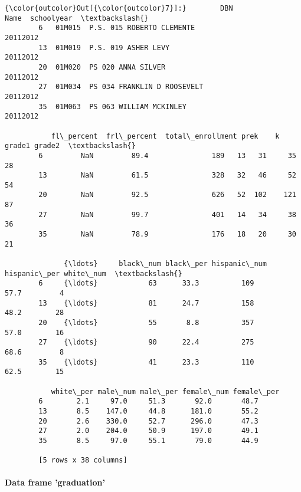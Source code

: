 \documentclass[11pt]{article}
\begin{document}
\begin{Verbatim}[commandchars=\\\{\}]
{\color{outcolor}Out[{\color{outcolor}7}]:}        DBN                                              Name  schoolyear  \textbackslash{}
        6   01M015  P.S. 015 ROBERTO CLEMENTE                           20112012   
        13  01M019  P.S. 019 ASHER LEVY                                 20112012   
        20  01M020  PS 020 ANNA SILVER                                  20112012   
        27  01M034  PS 034 FRANKLIN D ROOSEVELT                         20112012   
        35  01M063  PS 063 WILLIAM MCKINLEY                             20112012   
        
           fl\_percent  frl\_percent  total\_enrollment prek    k grade1 grade2  \textbackslash{}
        6         NaN         89.4               189   13   31     35     28   
        13        NaN         61.5               328   32   46     52     54   
        20        NaN         92.5               626   52  102    121     87   
        27        NaN         99.7               401   14   34     38     36   
        35        NaN         78.9               176   18   20     30     21   
        
              {\ldots}     black\_num black\_per hispanic\_num hispanic\_per white\_num  \textbackslash{}
        6     {\ldots}            63      33.3          109         57.7         4   
        13    {\ldots}            81      24.7          158         48.2        28   
        20    {\ldots}            55       8.8          357         57.0        16   
        27    {\ldots}            90      22.4          275         68.6         8   
        35    {\ldots}            41      23.3          110         62.5        15   
        
           white\_per male\_num male\_per female\_num female\_per  
        6        2.1     97.0     51.3       92.0       48.7  
        13       8.5    147.0     44.8      181.0       55.2  
        20       2.6    330.0     52.7      296.0       47.3  
        27       2.0    204.0     50.9      197.0       49.1  
        35       8.5     97.0     55.1       79.0       44.9  
        
        [5 rows x 38 columns]
\end{Verbatim}
            
    \paragraph{Data frame 'graduation'}\label{data-frame-graduation}
\end{document}
